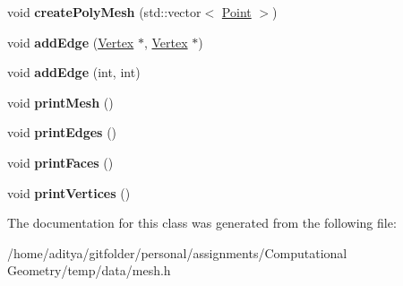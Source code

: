 \begin{DoxyCompactItemize}
\item 
\hypertarget{class_mesh_aaa724ceab60012b57627c34340d66616}{}void {\bfseries create\+Poly\+Mesh} (std\+::vector$<$ \hyperlink{class_point}{Point} $>$)\label{class_mesh_aaa724ceab60012b57627c34340d66616}

\item 
\hypertarget{class_mesh_af5fb35ad588ec605673c8496b114fc06}{}void {\bfseries add\+Edge} (\hyperlink{class_vertex}{Vertex} $\ast$, \hyperlink{class_vertex}{Vertex} $\ast$)\label{class_mesh_af5fb35ad588ec605673c8496b114fc06}

\item 
\hypertarget{class_mesh_ab86ed0a987ccd046c1688f3d0a460171}{}void {\bfseries add\+Edge} (int, int)\label{class_mesh_ab86ed0a987ccd046c1688f3d0a460171}

\item 
\hypertarget{class_mesh_a2ad7545bcf7fbce12f2c189ed5410ffa}{}void {\bfseries print\+Mesh} ()\label{class_mesh_a2ad7545bcf7fbce12f2c189ed5410ffa}

\item 
\hypertarget{class_mesh_a8395156e78db09d1573d6becc7299d4f}{}void {\bfseries print\+Edges} ()\label{class_mesh_a8395156e78db09d1573d6becc7299d4f}

\item 
\hypertarget{class_mesh_aa66834e747759b1c9bead9947b28bc41}{}void {\bfseries print\+Faces} ()\label{class_mesh_aa66834e747759b1c9bead9947b28bc41}

\item 
\hypertarget{class_mesh_ac1ba03d3e1d7ad3187acbecf91c9107c}{}void {\bfseries print\+Vertices} ()\label{class_mesh_ac1ba03d3e1d7ad3187acbecf91c9107c}

\end{DoxyCompactItemize}


The documentation for this class was generated from the following file\+:\begin{DoxyCompactItemize}
\item 
/home/aditya/gitfolder/personal/assignments/\+Computational Geometry/temp/data/mesh.\+h\end{DoxyCompactItemize}
